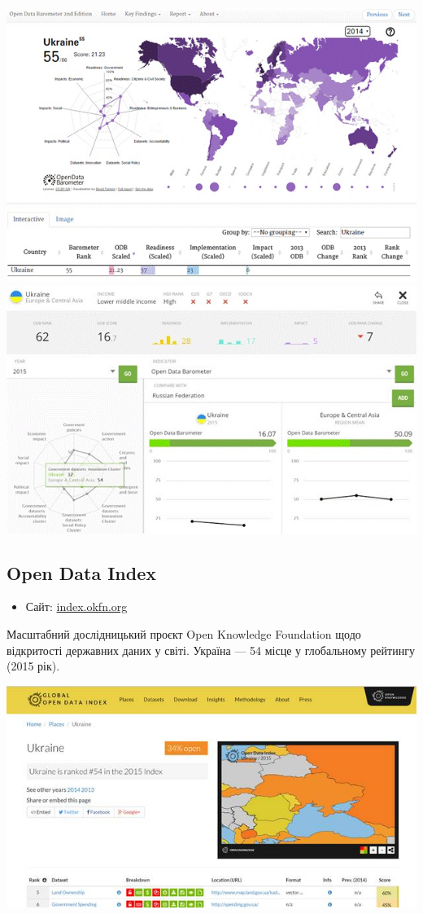 \includegraphics{images/010.jpg}
\includegraphics{images/011.jpg}
\includegraphics{images/012.jpg}

\subsection{Open Data Index}

\begin{itemize}
    \item Сайт: \href{https://index.okfn.org/}{index.okfn.org}
\end{itemize}

Масштабний дослідницький проєкт Open Knowledge Foundation щодо відкритості державних даних у світі. Україна — 54 місце у глобальному рейтингу (2015 рік).

\includegraphics{images/013.jpg}

